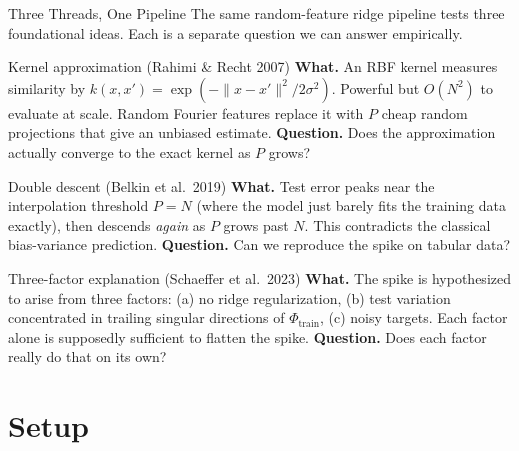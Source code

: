 \documentclass{beamer}
\begin{document}
\begin{frame}{Three Threads, One Pipeline}
\scriptsize
The same random-feature ridge pipeline tests three foundational ideas. Each is a separate question we can answer empirically.
\vfill
\begin{block}{Kernel approximation (Rahimi \& Recht 2007)}
\textbf{What.} An RBF kernel measures similarity by $k(x, x') = \exp(-\|x - x'\|^2 / 2\sigma^2)$. Powerful but $O(N^2)$ to evaluate at scale. Random Fourier features replace it with $P$ cheap random projections that give an unbiased estimate. \textbf{Question.} Does the approximation actually converge to the exact kernel as $P$ grows?
\end{block}
\begin{block}{Double descent (Belkin et al.\ 2019)}
\textbf{What.} Test error peaks near the interpolation threshold $P{=}N$ (where the model just barely fits the training data exactly), then descends \emph{again} as $P$ grows past $N$. This contradicts the classical bias-variance prediction. \textbf{Question.} Can we reproduce the spike on tabular data?
\end{block}
\begin{block}{Three-factor explanation (Schaeffer et al.\ 2023)}
\textbf{What.} The spike is hypothesized to arise from three factors: (a) no ridge regularization, (b) test variation concentrated in trailing singular directions of $\Phi_{\text{train}}$, (c) noisy targets. Each factor alone is supposedly sufficient to flatten the spike. \textbf{Question.} Does each factor really do that on its own?
\end{block}
\end{frame}

\section{Setup}
\end{document}
